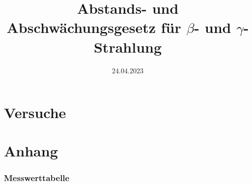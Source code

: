 
\usepackage{isotope}
\usepackage{subfiles}

\title{Abstands- und Abschwächungsgesetz für $\beta$- und $\gamma$-Strahlung}
\date{24.04.2023}


\maketitle


\newpage

\newpage
\part{Versuche}

\newpage

\newpage

\newpage

\newpage
\part{Anhang}
\printbibliography[heading=bibnumbered,title=Referenzen und Literatur]
\newpage
\section{Messwerttabelle}
